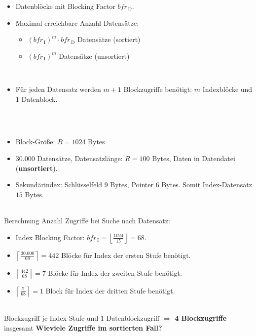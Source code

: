 \begin{frame}{\insertsection}
\begin{columns}[T]
\begin{column}{.51\textwidth}
\begin{itemize}
\ \\[8pt]\pause
\item Datenbl\"ocke mit Blocking Factor $bfr_\mathrm{\,D}$.
\item Maximal erreichbare Anzahl Datens\"atze: 
\begin{itemize}
	\item $(bfr_\mathrm{\,I})^m\cdot bfr_\mathrm{\,D}$ Datens\"atze (sortiert)\\[4pt]
	\item $(bfr_\mathrm{\,I})^m$ Datens\"atze (unsortiert)
\end{itemize}
\ \\[8pt]\pause
\item F\"ur jeden Datensatz werden $m+1$ Blockzugriffe ben\"otigt: $m$ Indexbl\"ocke und $1$ Datenblock.
\end{itemize}
\end{column}
\end{columns}
\end{frame}

\begin{frame}{\insertsection}
\framesubtitle{\insertsubsection}
\\[4pt]
\begin{itemize}
	\item Block-Gr\"o\ss e: $B=1024$ Bytes
	\item 30.000 Datens\"atze, Datensatzl\"ange: $R=100$ Bytes, Daten in Datendatei (\textbf{unsortiert}).
	\item Sekund\"arindex: Schl\"usselfeld $9$ Bytes, Pointer $6$ Bytes. Somit Index-Datensatz $15$ Bytes.
\end{itemize}
\pause
\ \\[4pt]
Berechnung Anzahl Zugriffe bei Suche nach Datensatz:
\begin{itemize}
	\item Index Blocking Factor: $bfr_\mathrm{\,I}=\left \lfloor\frac{1024}{15}\right\rfloor = 68$.
	\item $\left\lceil\frac{30.000}{68}\right\rceil = 442$ Bl\"ocke f\"ur Index der ersten Stufe ben\"otigt.
	\item $\left\lceil\frac{442}{68}\right\rceil = 7$ Bl\"ocke f\"ur Index der zweiten Stufe ben\"otigt.
	\item $\left\lceil\frac{7}{68}\right\rceil = 1$ Block f\"ur Index der dritten Stufe ben\"otigt.
\end{itemize}
\ \\[4pt]
 Blockzugriff je Index-Stufe und 1 Datenblockzugriff $\Rightarrow$ \textbf{4 Blockzugriffe} insgesamt 
\pause\nl\textbf{Wieviele Zugriffe im sortierten Fall?}
\end{frame}

